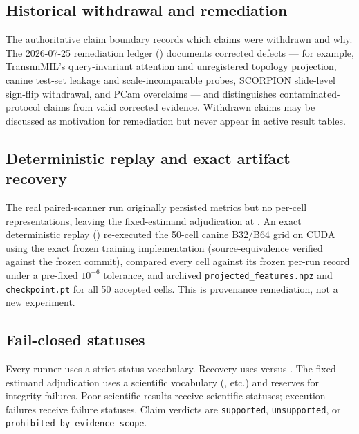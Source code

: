 \subsection{Historical withdrawal and remediation}

The authoritative claim boundary records which claims were withdrawn and why.
The 2026-07-25 remediation ledger (\texttt{})
documents corrected defects --- for example, TransnnMIL's query-invariant
attention and unregistered topology projection, canine test-set leakage and
scale-incomparable probes, SCORPION slide-level sign-flip withdrawal, and PCam
overclaims --- and distinguishes contaminated-protocol claims from valid
corrected evidence. Withdrawn claims may be discussed as motivation for
remediation but never appear in active result tables.

\subsection{Deterministic replay and exact artifact recovery}

The real paired-scanner run originally persisted metrics but no per-cell
representations, leaving the fixed-estimand adjudication at
\texttt{}. An exact deterministic replay
(\texttt{}) re-executed the
50-cell canine B32/B64 grid on CUDA using the exact frozen training
implementation (source-equivalence verified against the frozen commit), compared
every cell against its frozen per-run record under a pre-fixed $10^{-6}$
tolerance, and archived \texttt{projected\_features.npz} and
\texttt{checkpoint.pt} for all 50 accepted cells. This is provenance
remediation, not a new experiment.

\subsection{Fail-closed statuses}

Every runner uses a strict status vocabulary. Recovery uses
\texttt{} versus
\texttt{}. The fixed-estimand
adjudication uses a scientific vocabulary
(\texttt{}, etc.) and
reserves \texttt{} for integrity failures.
Poor scientific results receive scientific statuses; execution failures receive
failure statuses. Claim verdicts are \texttt{supported},
\texttt{unsupported}, or \texttt{prohibited by evidence scope}.


